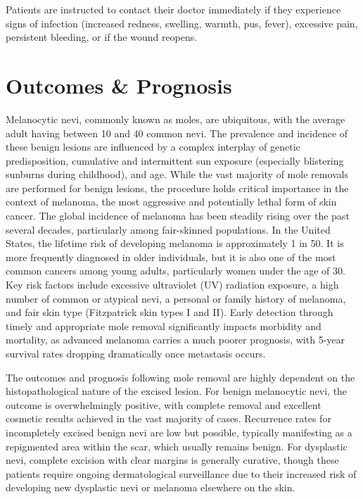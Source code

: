 Patients are instructed to contact their doctor immediately if they experience signs of infection (increased redness, swelling, warmth, pus, fever), excessive pain, persistent bleeding, or if the wound reopens.

\section*{Outcomes \& Prognosis}
Melanocytic nevi, commonly known as moles, are ubiquitous, with the average adult having between 10 and 40 common nevi. The prevalence and incidence of these benign lesions are influenced by a complex interplay of genetic predisposition, cumulative and intermittent sun exposure (especially blistering sunburns during childhood), and age. While the vast majority of mole removals are performed for benign lesions, the procedure holds critical importance in the context of melanoma, the most aggressive and potentially lethal form of skin cancer. The global incidence of melanoma has been steadily rising over the past several decades, particularly among fair-skinned populations. In the United States, the lifetime risk of developing melanoma is approximately 1 in 50. It is more frequently diagnosed in older individuals, but it is also one of the most common cancers among young adults, particularly women under the age of 30. Key risk factors include excessive ultraviolet (UV) radiation exposure, a high number of common or atypical nevi, a personal or family history of melanoma, and fair skin type (Fitzpatrick skin types I and II). Early detection through timely and appropriate mole removal significantly impacts morbidity and mortality, as advanced melanoma carries a much poorer prognosis, with 5-year survival rates dropping dramatically once metastasis occurs.

The outcomes and prognosis following mole removal are highly dependent on the histopathological nature of the excised lesion. For benign melanocytic nevi, the outcome is overwhelmingly positive, with complete removal and excellent cosmetic results achieved in the vast majority of cases. Recurrence rates for incompletely excised benign nevi are low but possible, typically manifesting as a repigmented area within the scar, which usually remains benign. For dysplastic nevi, complete excision with clear margins is generally curative, though these patients require ongoing dermatological surveillance due to their increased risk of developing new dysplastic nevi or melanoma elsewhere on the skin.

